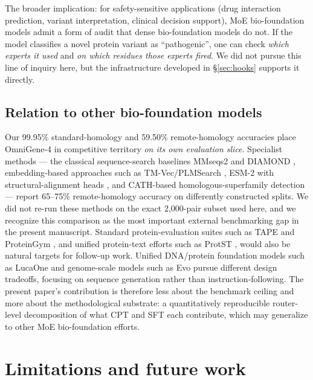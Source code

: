 \documentclass[11pt]{article}
\begin{document}
The broader implication: for safety-sensitive applications (drug interaction prediction, variant interpretation, clinical decision support), MoE bio-foundation models admit a form of audit that dense bio-foundation models do not. If the model classifies a novel protein variant as ``pathogenic'', one can check \emph{which experts it used} and \emph{on which residues those experts fired}. We did not pursue this line of inquiry here, but the infrastructure developed in \S\ref{sec:hooks} supports it directly.

\subsection{Relation to other bio-foundation models}

Our 99.95\% standard-homology and 59.50\% remote-homology accuracies place OmniGene-4 in competitive territory \emph{on its own evaluation slice}. Specialist methods --- the classical sequence-search baselines MMseqs2 \citep{steinegger2017mmseqs2} and DIAMOND \citep{buchfink2021diamond}, embedding-based approaches such as TM-Vec/PLMSearch \citep{liu2024plmsearch}, ESM-2 with structural-alignment heads \citep{hamamsy2024protein}, and CATH-based homologous-superfamily detection \citep{nallapareddy2023cathe} --- report 65--75\% remote-homology accuracy on differently constructed splits. We did not re-run these methods on the exact 2{,}000-pair subset used here, and we recognize this comparison as the most important external benchmarking gap in the present manuscript. Standard protein-evaluation suites such as TAPE \citep{rao2019tape} and ProteinGym \citep{notin2023proteingym}, and unified protein-text efforts such as ProtST \citep{xu2023protst}, would also be natural targets for follow-up work. Unified DNA/protein foundation models such as LucaOne \citep{he2024lucaone} and genome-scale models such as Evo \citep{nguyen2024evo, brixi2026evo2} pursue different design tradeoffs, focusing on sequence generation rather than instruction-following. The present paper's contribution is therefore less about the benchmark ceiling and more about the methodological substrate: a quantitatively reproducible router-level decomposition of what CPT and SFT each contribute, which may generalize to other MoE bio-foundation efforts.

\section{Limitations and future work}
\label{sec:limitations}
\end{document}
